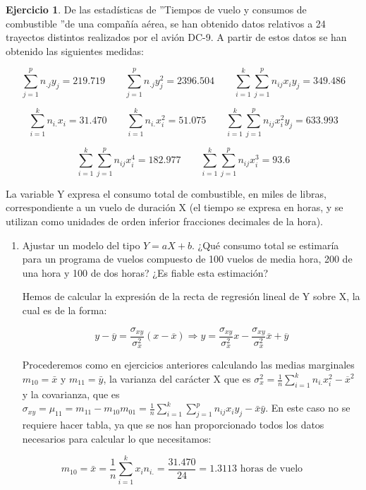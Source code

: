 \documentclass[a4paper, 12pt]{article}
\theoremstyle{definition}
\newtheorem{ej}{Ejercicio}
\begin{document}
\begin{ej}
De las estadísticas de ”Tiempos de vuelo y consumos de combustible ”de una compañía aérea, se
han obtenido datos relativos a 24 trayectos distintos realizados por el avión DC-9. A partir de
estos datos se han obtenido las siguientes medidas:

\[
    \sum_{j=1}^{p}n_{.j}y_j = 219.719 \qquad \sum_{j=1}^{p}n_{.j}y_{j}^{2} = 2396.504 \qquad \sum_{i=1}^{k}\sum_{j=1}^{p}n_{ij}x_i y_j = 349.486
\]

\[
    \sum_{i=1}^{k}n_{i.}x_i = 31.470 \qquad \sum_{i=1}^{k}n_{i.}x_{i}^{2} = 51.075 \qquad \sum_{i=1}^{k}\sum_{j=1}^{p}n_{ij}x_{i}^{2} y_j = 633.993
\]

\[
    \sum_{i=1}^{k}\sum_{j=1}^{p}n_{ij}x_{i}^{4} = 182.977 \qquad \sum_{i=1}^{k}\sum_{j=1}^{p}n_{ij}x_{i}^{3} = 93.6
\]

La variable Y expresa el consumo total de combustible, en miles de libras, correspondiente a
un vuelo de duración X (el tiempo se expresa en horas, y se utilizan como unidades de orden
inferior fracciones decimales de la hora).

\begin{enumerate}[label=\alph*)]
\item Ajustar un modelo del tipo $Y = aX +b$. ¿Qué consumo total se estimaría para un programa
de vuelos compuesto de 100 vuelos de media hora, 200 de una hora y 100 de dos horas? ¿Es
fiable esta estimación?

Hemos de calcular la expresión de la recta de regresión lineal de Y sobre X, la cual es de la forma:

\[
    y - \overline{y}  =\frac{\sigma_{xy}}{\sigma_x^2} (x - \overline{x}) \Rightarrow y = \frac{\sigma_{xy}}{\sigma_x^2}x - \frac{\sigma_{xy}}{\sigma_x^2} \overline{x} + \overline{y}
\]

Procederemos como en ejercicios anteriores calculando las medias marginales $m_{10} = \bar{x}$ y $m_{11} = \bar{y}$, la varianza del carácter X que es $\sigma_{x}^{2} = \frac{1}{n} \sum_{i=1}^{k} n_{i.} x_i^2 - \overline{x}^{2}$ y la covarianza, que es $\sigma_{xy} = \mu_{11} = m_{11} - m_{10}m_{01} = \frac{1}{n}\sum_{i=1}^{k}\sum_{j=1}^{p}n_{ij}x_i y_j - \bar{x}\bar{y}$. En este caso no se requiere hacer tabla, ya que se nos han proporcionado todos los datos necesarios para calcular lo que necesitamos:

\[
    m_{10} = \bar{x} = \frac{1}{n} \sum_{i=1}^{k} x_i n_{i.} = \frac{31.470}{24} = 1.3113 \text{ horas de vuelo} \qquad
\]


\end{enumerate}
\end{ej}
\end{document}
